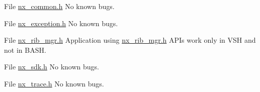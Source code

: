 \label{bug__bug000007}
\hypertarget{bug__bug000007}{}
 
\begin{DoxyDescription}
\item[File \hyperlink{nx__common_8h}{nx\_\-common.h} ]No known bugs. 
\end{DoxyDescription}

\label{bug__bug000002}
\hypertarget{bug__bug000002}{}
 
\begin{DoxyDescription}
\item[File \hyperlink{nx__exception_8h}{nx\_\-exception.h} ]No known bugs. 
\end{DoxyDescription}

\label{bug__bug000003}
\hypertarget{bug__bug000003}{}
 
\begin{DoxyDescription}
\item[File \hyperlink{nx__rib__mgr_8h}{nx\_\-rib\_\-mgr.h} ]Application using \hyperlink{nx__rib__mgr_8h}{nx\_\-rib\_\-mgr.h} APIs work only in VSH and not in BASH. 
\end{DoxyDescription}

\label{bug__bug000004}
\hypertarget{bug__bug000004}{}
 
\begin{DoxyDescription}
\item[File \hyperlink{nx__sdk_8h}{nx\_\-sdk.h} ]No known bugs. 
\end{DoxyDescription}

\label{bug__bug000005}
\hypertarget{bug__bug000005}{}
 
\begin{DoxyDescription}
\item[File \hyperlink{nx__trace_8h}{nx\_\-trace.h} ]No known bugs. 
\end{DoxyDescription}